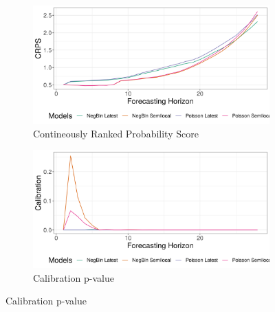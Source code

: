 \begin{figure}[H]
\begin{subfigure}{0.5\textwidth}
  \centering
  \includegraphics[width=\linewidth]{../output/Butembo_crps.png}  
  \caption{Contineously Ranked Probability Score}
  \label{fig:sub-first}
\end{subfigure}
\begin{subfigure}{0.5\textwidth}
  \centering
  \includegraphics[width=\linewidth]{../output/Butembo_calibration.png}  
  \caption{Calibration p-value}
  \label{fig:sub-second}
\end{subfigure}


\end{figure}
